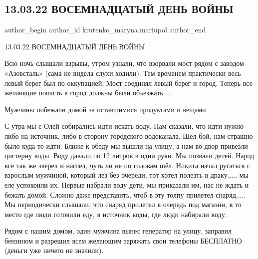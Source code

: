  
 
 
 
 

\subsection{13.03.22 ВОСЕМНАДЦАТЫЙ ДЕНЬ ВОЙНЫ}
\label{sec:13_03_2023.fb.krutenko_maryna.mariupol.1.18_den_13_03}

\ifcmt
 author_begin
   author_id krutenko_maryna.mariupol
 author_end
\fi

13.03.22 ВОСЕМНАДЦАТЫЙ ДЕНЬ ВОЙНЫ

Всю ночь  слышали взрывы, утром узнали, что взорвали мост рядом с заводом
«Азовсталь» (сама не видела слухи ходили). Тем временем практически весь левый
берег был по оккупацией.  Мост соединял левый берег и город. Теперь все
желающие попасть в город должны были объезжать.....

Мужчины побежали домой за оставшимися продуктами и вещами.

С утра мы с Олей собирались идти искать воду. Нам сказали, что идти нужно либо
на источник, либо в сторону городского водоканала. Шёл бой, нам страшно было
куда-то идти. Ближе к обеду мы вышли на улицу, а нам во двор привезли цистерну
воды. Воду давали по 12 литров в одни руки. Мы позвали детей. Народ все так же
зверел и наглел, чуть ли не по головам шёл. Никита начал ругаться с взрослым
мужчиной, который лез без очереди, тот хотел полезть в драку..... мы еле
успокоили их. Первые набрали воду дети, мы приказали им, нас не ждать и бежать
домой. Сложно даже представить, чтоб в эту толпу прилетел снаряд..... Мы
периодически слышали, что снаряд прилетел в очередь под магазин, в то место где
люди готовили еду, в источник воды, где люди набирали воду. 

Рядом с нашим домом, один мужчина вынес генератор на улицу, заправил бензином и
разрешил всем желающим заряжать свои телефоны БЕСПЛАТНО (деньги уже ничего не
значили).

